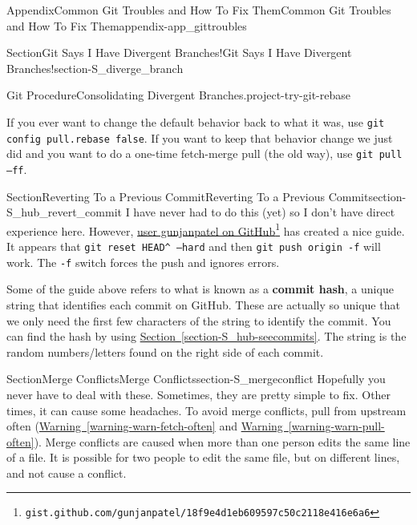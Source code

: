 \documentclass[oneside,10pt,]{book}
\newcommand{\xreffont}{\relax}
\newcommand{\mono}[1]{\texttt{#1}}
\newcommand{\terminology}[1]{\textbf{#1}}
\begin{document}
\begin{appendixptx}{Appendix}{Common Git Troubles and How To Fix Them}{}{Common Git Troubles and How To Fix Them}{}{}{appendix-app_gittroubles}
\begin{sectionptx}{Section}{Git Says I Have Divergent Branches!}{}{Git Says I Have Divergent Branches!}{}{}{section-S_diverge_branch}
\begin{project}{Git Procedure}{Consolidating Divergent Branches.}{project-try-git-rebase}
\begin{enumerate}[font=\bfseries,label=(\alph*),ref=\alph*]
If you ever want to change the default behavior back to what it was, use \mono{git config pull.rebase false}. If you want to keep that behavior change we just did and you want to do a one-time fetch-merge pull (the old way), use \mono{git pull --ff}.%
\end{enumerate}%
\end{project}%
\end{sectionptx}
%
%
\typeout{************************************************}
\typeout{************************************************}
%
\begin{sectionptx}{Section}{Reverting To a Previous Commit}{}{Reverting To a Previous Commit}{}{}{section-S_hub_revert_commit}
%
%
%
%
%
I have never had to do this (yet) so I don't have direct experience here. However, \href{https://gist.github.com/gunjanpatel/18f9e4d1eb609597c50c2118e416e6a6}{user gunjanpatel on GitHub}\footnote{\nolinkurl{gist.github.com/gunjanpatel/18f9e4d1eb609597c50c2118e416e6a6}\label{fn-S_hub_revert_commit-g-b}} has created a nice guide. It appears that \mono{git reset HEAD\textasciicircum{} --hard} and then \mono{git push origin -f} will work. The \mono{-f} switch forces the push and ignores errors.%
\par
Some of the guide above refers to what is known as a \terminology{commit hash}, a unique string that identifies each commit on GitHub. These are actually so unique that we only need the first few characters of the string to identify the commit. You can find the hash by using \hyperref[section-S_hub-seecommits]{Section~{\xreffont\ref{section-S_hub-seecommits}}}. The string is the random numbers\slash{}letters found on the right side of each commit.%
\end{sectionptx}
%
%
\typeout{************************************************}
\typeout{************************************************}
%
\begin{sectionptx}{Section}{Merge Conflicts}{}{Merge Conflicts}{}{}{section-S_mergeconflict}
Hopefully you never have to deal with these. Sometimes, they are pretty simple to fix. Other times, it can cause some headaches. To avoid merge conflicts, pull from upstream often (\hyperref[warning-warn-fetch-often]{Warning~{\xreffont\ref{warning-warn-fetch-often}}} and \hyperref[warning-warn-pull-often]{Warning~{\xreffont\ref{warning-warn-pull-often}}}). Merge conflicts are caused when more than one person edits the same line of a file. It is possible for two people to edit the same file, but on different lines, and not cause a conflict.%

\end{sectionptx}
\end{appendixptx}
\end{document}
